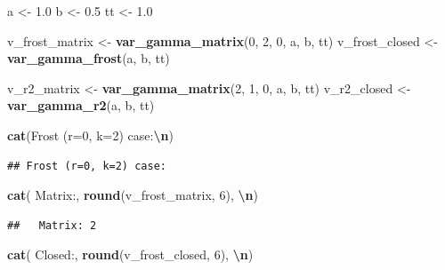 \documentclass[
  11pt,
]{article}
\newenvironment{Shaded}{\begin{snugshade}}{\end{snugshade}}
\newcommand{\DecValTok}[1]{\textcolor[rgb]{0.00,0.00,0.81}{#1}}
\newcommand{\FloatTok}[1]{\textcolor[rgb]{0.00,0.00,0.81}{#1}}
\newcommand{\FunctionTok}[1]{\textcolor[rgb]{0.13,0.29,0.53}{\textbf{#1}}}
\newcommand{\NormalTok}[1]{#1}
\newcommand{\OtherTok}[1]{\textcolor[rgb]{0.56,0.35,0.01}{#1}}
\newcommand{\SpecialCharTok}[1]{\textcolor[rgb]{0.81,0.36,0.00}{\textbf{#1}}}
\newcommand{\StringTok}[1]{\textcolor[rgb]{0.31,0.60,0.02}{#1}}
\begin{document}
\begin{Shaded}
\begin{Highlighting}[]
\NormalTok{a }\OtherTok{\textless{}{-}} \FloatTok{1.0}
\NormalTok{b }\OtherTok{\textless{}{-}} \FloatTok{0.5}
\NormalTok{tt }\OtherTok{\textless{}{-}} \FloatTok{1.0}

\NormalTok{v\_frost\_matrix }\OtherTok{\textless{}{-}} \FunctionTok{var\_gamma\_matrix}\NormalTok{(}\DecValTok{0}\NormalTok{, }\DecValTok{2}\NormalTok{, }\DecValTok{0}\NormalTok{, a, b, tt)}
\NormalTok{v\_frost\_closed }\OtherTok{\textless{}{-}} \FunctionTok{var\_gamma\_frost}\NormalTok{(a, b, tt)}

\NormalTok{v\_r2\_matrix }\OtherTok{\textless{}{-}} \FunctionTok{var\_gamma\_matrix}\NormalTok{(}\DecValTok{2}\NormalTok{, }\DecValTok{1}\NormalTok{, }\DecValTok{0}\NormalTok{, a, b, tt)}
\NormalTok{v\_r2\_closed }\OtherTok{\textless{}{-}} \FunctionTok{var\_gamma\_r2}\NormalTok{(a, b, tt)}

\FunctionTok{cat}\NormalTok{(}\StringTok{\textquotesingle{}Frost (r=0, k=2) case:}\SpecialCharTok{\textbackslash{}n}\StringTok{\textquotesingle{}}\NormalTok{)}
\end{Highlighting}
\end{Shaded}

\begin{verbatim}
## Frost (r=0, k=2) case:
\end{verbatim}

\begin{Shaded}
\begin{Highlighting}[]
\FunctionTok{cat}\NormalTok{(}\StringTok{\textquotesingle{}  Matrix:\textquotesingle{}}\NormalTok{, }\FunctionTok{round}\NormalTok{(v\_frost\_matrix, }\DecValTok{6}\NormalTok{), }\StringTok{\textquotesingle{}}\SpecialCharTok{\textbackslash{}n}\StringTok{\textquotesingle{}}\NormalTok{)}
\end{Highlighting}
\end{Shaded}

\begin{verbatim}
##   Matrix: 2
\end{verbatim}

\begin{Shaded}
\begin{Highlighting}[]
\FunctionTok{cat}\NormalTok{(}\StringTok{\textquotesingle{}  Closed:\textquotesingle{}}\NormalTok{, }\FunctionTok{round}\NormalTok{(v\_frost\_closed, }\DecValTok{6}\NormalTok{), }\StringTok{\textquotesingle{}}\SpecialCharTok{\textbackslash{}n}\StringTok{\textquotesingle{}}\NormalTok{)}
\end{Highlighting}
\end{Shaded}
\end{document}
